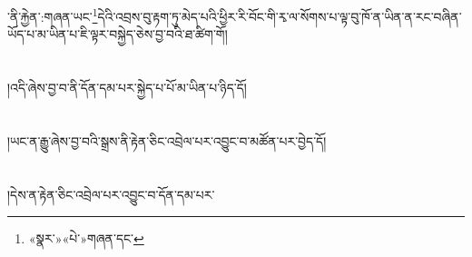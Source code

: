 ་ནི་རྐྱེན་:གཞན་ཡང་\footnote{«སྣར་»«པེ་»གཞན་དང་}དེའི་འབྲས་བུ་རྟག་ཏུ་མེད་པའི་ཕྱིར་རི་བོང་གི་རྭ་ལ་སོགས་པ་ལྟ་བུ་ཁོ་ན་ཡིན་ན་རང་བཞིན་ཡོད་པ་མ་ཡིན་པ་ཇི་ལྟར་བསྐྱེད་ཅེས་བྱ་བའི་ཐ་ཚིག་གོ།\chapter{ }།འདི་ཞེས་བྱ་བ་ནི་དོན་དམ་པར་སྐྱེད་པ་པོ་མ་ཡིན་པ་ཉིད་དོ།\chapter{ }།ཡང་ན་རྒྱུ་ཞེས་བྱ་བའི་སྒྲས་ནི་རྟེན་ཅིང་འབྲེལ་པར་འབྱུང་བ་མཚོན་པར་བྱེད་དོ།\chapter{ }།དེས་ན་རྟེན་ཅིང་འབྲེལ་པར་འབྱུང་བ་དོན་དམ་པར་